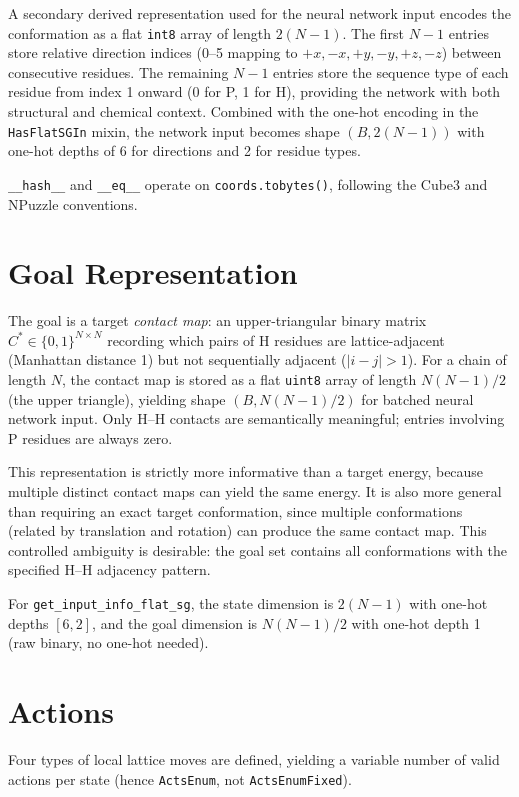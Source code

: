 \documentclass[11pt]{article}
\begin{document}
A secondary derived representation used for the neural network input encodes the conformation as a flat \texttt{int8} array of length $2(N{-}1)$. The first $N{-}1$ entries store relative direction indices (0--5 mapping to $+x, -x, +y, -y, +z, -z$) between consecutive residues. The remaining $N{-}1$ entries store the sequence type of each residue from index 1 onward (0 for P, 1 for H), providing the network with both structural and chemical context. Combined with the one-hot encoding in the \texttt{HasFlatSGIn} mixin, the network input becomes shape $(B, 2(N{-}1))$ with one-hot depths of 6 for directions and 2 for residue types.

\texttt{\_\_hash\_\_} and \texttt{\_\_eq\_\_} operate on \texttt{coords.tobytes()}, following the Cube3 and NPuzzle conventions.


\section{Goal Representation}

The goal is a target \textit{contact map}: an upper-triangular binary matrix $C^* \in \{0,1\}^{N \times N}$ recording which pairs of H residues are lattice-adjacent (Manhattan distance 1) but not sequentially adjacent ($|i - j| > 1$). For a chain of length $N$, the contact map is stored as a flat \texttt{uint8} array of length $N(N{-}1)/2$ (the upper triangle), yielding shape $(B, N(N{-}1)/2)$ for batched neural network input. Only H--H contacts are semantically meaningful; entries involving P residues are always zero.

This representation is strictly more informative than a target energy, because multiple distinct contact maps can yield the same energy. It is also more general than requiring an exact target conformation, since multiple conformations (related by translation and rotation) can produce the same contact map. This controlled ambiguity is desirable: the goal set contains all conformations with the specified H--H adjacency pattern.

For \texttt{get\_input\_info\_flat\_sg}, the state dimension is $2(N{-}1)$ with one-hot depths $[6, 2]$, and the goal dimension is $N(N{-}1)/2$ with one-hot depth 1 (raw binary, no one-hot needed).


\section{Actions}

Four types of local lattice moves are defined, yielding a variable number of valid actions per state (hence \texttt{ActsEnum}, not \texttt{ActsEnumFixed}).
\end{document}
